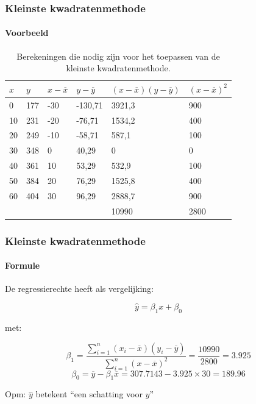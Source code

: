 \documentclass[aspectratio=169]{beamer}
\begin{document}
\begin{frame}
  \frametitle{Kleinste kwadratenmethode}
  \framesubtitle{Voorbeeld}
  
  \begin{table}[h] \centering \footnotesize
    \begin{tabular}{@{}llllll@{}}
      \toprule
      $x$   & $y$     & $x-\overline{x}$    & $y - \overline{y}$        & $(x-\overline{x})(y - \overline{y})$       &  $(x-\overline{x})^{2}$    \\ \midrule
      0  & 177 & -30 & -130,71 & 3921,3 & 900  \\
      10 & 231 & -20 & -76,71  & 1534,2 & 400  \\
      20 & 249 & -10 & -58,71  & 587,1  & 100  \\
      30 & 348 & 0   & 40,29   & 0      & 0    \\
      40 & 361 & 10  & 53,29   & 532,9  & 100  \\
      50 & 384 & 20  & 76,29   & 1525,8 & 400  \\
      60 & 404 & 30  & 96,29   & 2888,7 & 900  \\
      &     &     &         & 10990  & 2800 \\ \bottomrule
    \end{tabular}
    \caption{Berekeningen die nodig zijn voor het toepassen van de kleinste kwadratenmethode.}
    \label{tab:rendieren2}
  \end{table}
\end{frame}

\begin{frame}
  \frametitle{Kleinste kwadratenmethode}
  \framesubtitle{Formule}
  
  De regressierechte heeft als vergelijking:
  
  \[ \hat{y} = \beta_1 x + \beta_0 \]
  
  met:
  
  \[ \beta_{1} = \frac{\sum_{i=1}^{n} (x_{i}-\overline{x})(y_{i} - \overline{y})}{\sum_{i=1}^{n} (x-\overline{x})^{2}} = \frac{10990}{2800} = 3.925 \]
  \[ \beta_{0} = \overline{y} - \beta_{1} \overline{x} = 307.7143 - 3.925 \times 30 = 189.96 \]
  
  Opm: $\hat{y}$ betekent ``een schatting voor $y$''
\end{frame}
\end{document}
